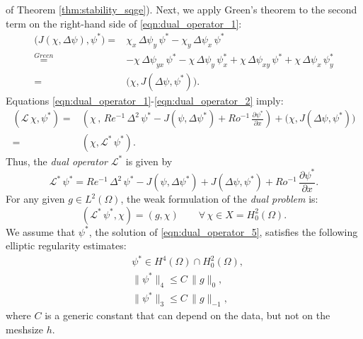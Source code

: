 of Theorem \ref{thm:stability_sqge}).
Next, we apply Green's theorem to the second term on the right-hand side of
\eqref{eqn:dual_operator_1}:
\begin{align}
  \biggl( J(\chi , \Delta \psi) , \psi^* \biggr) =& \chi_x \, \Delta \psi_y \, \psi^*
     - \chi_y \, \Delta \psi_x \, \psi^* \nonumber \\
  \stackrel{Green}{=}& - \chi \, \Delta \psi_{y x} \, \psi^* - \chi \, \Delta
    \psi_y \, \psi^*_x + \chi \, \Delta \psi_{x y} \, \psi^* + \chi \, \Delta
    \psi_x \, \psi^*_y \nonumber \\
  =& \biggl( \chi , J(\Delta \psi , \psi^*) \biggr) .
  \label{eqn:dual_operator_2}
\end{align}
Equations \eqref{eqn:dual_operator_1}-\eqref{eqn:dual_operator_2} imply:
\begin{align}
  (\mathcal{L} \, \chi , \psi^*) =& \left( \chi \, , \, Re^{-1} \, \Delta^2 \, \psi^*
    - J(\psi , \Delta \psi^* ) + Ro^{-1} \, \frac{\partial \psi^*}{\partial x} \right)
    + \biggl( \chi , J(\Delta \psi , \psi^*) \biggr) \nonumber \\
  =& ( \chi , \mathcal{L}^* \, \psi^*) .
  \label{eqn:dual_operator_3}
\end{align}
Thus, the \emph{dual operator} $\mathcal{L}^*$ is given by
\begin{equation}
  \mathcal{L}^* \, \psi^* = Re^{-1} \, \Delta^2 \, \psi^* - J(\psi , \Delta \psi^* )
    + J(\Delta \psi , \psi^* ) + Ro^{-1} \, \frac{\partial \psi^*}{\partial x} .
  \label{eqn:dual_operator_4}
\end{equation}
For any given $g \in L^2(\Omega)$, the weak formulation of the \emph{dual
problem} is:
\begin{equation}
  ( \mathcal{L}^* \, \psi^* , \chi ) = (g , \chi)
    \qquad \forall \, \chi \in X = H_0^2(\Omega) .
  \label{eqn:dual_operator_5}
\end{equation}
We assume that $\psi^*$, the solution of \eqref{eqn:dual_operator_5}, satisfies
the following elliptic regularity estimates:
\begin{align}
  & \psi^* \in H^4(\Omega) \cap H^2_0(\Omega), \label{eqn:dual_operator_6a} \\[0.2cm]
  & \| \psi^* \|_4 \le C \, \|g\|_{0}, \label{eqn:dual_operator_6b} \\[0.2cm]
  & \| \psi^* \|_3 \le C \, \|g\|_{-1}, \label{eqn:dual_operator_6c}
\end{align}
where $C$ is a generic constant that can depend on the data, but not on the
meshsize $h$.
